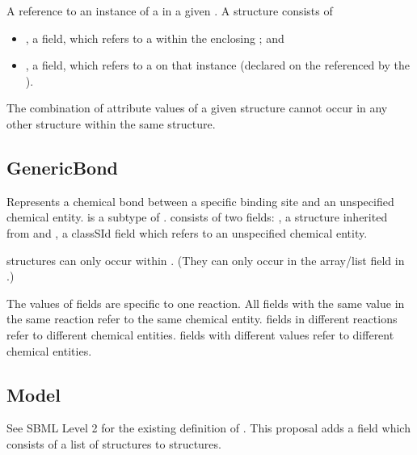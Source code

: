 \documentclass{cekarticle}
\begin{document}
A reference to an instance of a  in a given .
A  structure consists of

\begin{itemize}

\item {}, a  field,
which refers to a  within the enclosing
; and

\item {}, a  field, which refers to a 
on that instance (declared on the  referenced by the
).

\end{itemize}

The combination of attribute values of a given  structure cannot
occur in any other  structure within the same 
structure.  

\subsection{GenericBond}

Represents a chemical bond between a specific binding site and an unspecified chemical entity.
 is a subtype of .   consists
of two fields: , a  structure inherited from
 and , a class{SId} field which refers to an unspecified
chemical entity.

 structures can only occur within . (They can only occur
in the  array/list field in .)

The values of  fields are specific to one reaction.  All 
fields with the same value in the same reaction refer to the same chemical entity.
 fields in different reactions refer to different chemical entities.
 fields with different values refer to different chemical entities.

\subsection{Model}

See SBML Level 2 for the existing definition of .  This proposal adds a
 field which consists of a list of  structures to
 structures.  
\end{document}
